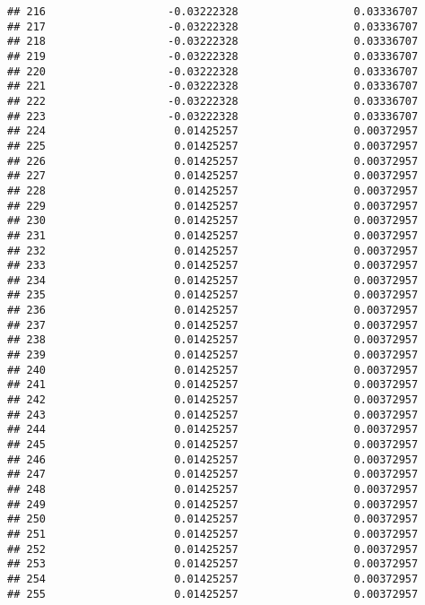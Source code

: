 \documentclass[]{article}
\begin{document}
\begin{verbatim}
## 216                   -0.03222328                  0.03336707
## 217                   -0.03222328                  0.03336707
## 218                   -0.03222328                  0.03336707
## 219                   -0.03222328                  0.03336707
## 220                   -0.03222328                  0.03336707
## 221                   -0.03222328                  0.03336707
## 222                   -0.03222328                  0.03336707
## 223                   -0.03222328                  0.03336707
## 224                    0.01425257                  0.00372957
## 225                    0.01425257                  0.00372957
## 226                    0.01425257                  0.00372957
## 227                    0.01425257                  0.00372957
## 228                    0.01425257                  0.00372957
## 229                    0.01425257                  0.00372957
## 230                    0.01425257                  0.00372957
## 231                    0.01425257                  0.00372957
## 232                    0.01425257                  0.00372957
## 233                    0.01425257                  0.00372957
## 234                    0.01425257                  0.00372957
## 235                    0.01425257                  0.00372957
## 236                    0.01425257                  0.00372957
## 237                    0.01425257                  0.00372957
## 238                    0.01425257                  0.00372957
## 239                    0.01425257                  0.00372957
## 240                    0.01425257                  0.00372957
## 241                    0.01425257                  0.00372957
## 242                    0.01425257                  0.00372957
## 243                    0.01425257                  0.00372957
## 244                    0.01425257                  0.00372957
## 245                    0.01425257                  0.00372957
## 246                    0.01425257                  0.00372957
## 247                    0.01425257                  0.00372957
## 248                    0.01425257                  0.00372957
## 249                    0.01425257                  0.00372957
## 250                    0.01425257                  0.00372957
## 251                    0.01425257                  0.00372957
## 252                    0.01425257                  0.00372957
## 253                    0.01425257                  0.00372957
## 254                    0.01425257                  0.00372957
## 255                    0.01425257                  0.00372957

\end{verbatim}
\end{document}
